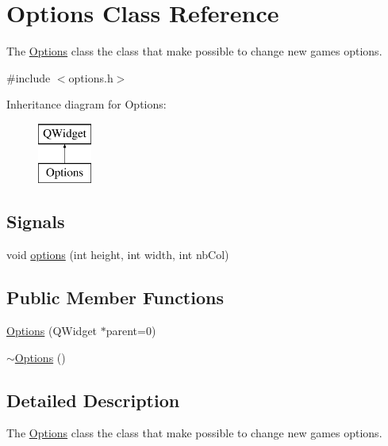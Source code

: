 \hypertarget{class_options}{}\section{Options Class Reference}
\label{class_options}


The \hyperlink{class_options}{Options} class the class that make possible to change new game\textquotesingle{}s options.  




{\ttfamily \#include $<$options.\+h$>$}

Inheritance diagram for Options\+:\begin{figure}[H]
\begin{center}
\leavevmode
\includegraphics[height=2.000000cm]{class_options}
\end{center}
\end{figure}
\subsection*{Signals}
\begin{DoxyCompactItemize}
\item 
void \hyperlink{class_options_aebc534fbc72d1be99b44fdd691d10ebc}{options} (int height, int width, int nb\+Col)
\end{DoxyCompactItemize}
\subsection*{Public Member Functions}
\begin{DoxyCompactItemize}
\item 
\hyperlink{class_options_a87403ad1d6bd9ae2b54af860bb0f0952}{Options} (Q\+Widget $\ast$parent=0)
\item 
\hyperlink{class_options_a86ddb85b183f8b58af5481f30a42fa92}{$\sim$\+Options} ()
\end{DoxyCompactItemize}


\subsection{Detailed Description}
The \hyperlink{class_options}{Options} class the class that make possible to change new game\textquotesingle{}s options. 

